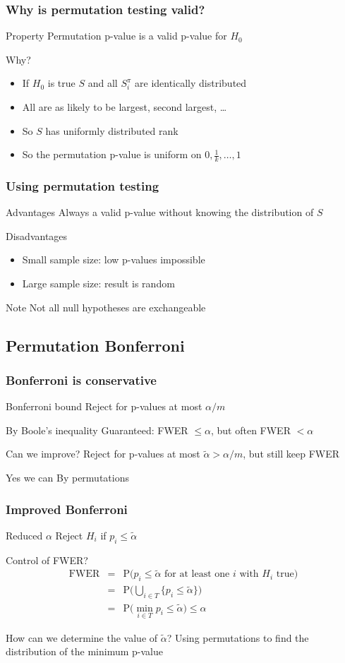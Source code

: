 \documentclass[compress]{beamer}
\newcommand{\bb}[1]{\begin{block}{#1}}
\newcommand{\eb}{\end{block}}
\newcommand{\bi}{\begin {itemize}}
\newcommand{\ei}{\end{itemize}}
\newcommand{\bfr}[1]{\begin{frame} \frametitle{#1}}
\begin{document}
\bfr{Why is permutation testing valid?}
  \bb{Property}
    Permutation p-value is a valid p-value for $H_0$
  \eb
  \bb{Why?}
    \bi
      \item If $H_0$ is true $S$ and all $S^\pi_i$ are identically distributed
      \item All are as likely to be largest, second largest, \ldots
      \item So $S$ has uniformly distributed rank
      \item So the permutation p-value is uniform on $0, \frac1k, \ldots, 1$
    \ei
  \eb
\end{frame}


\bfr{Using permutation testing}
  \bb{Advantages}
    Always a valid p-value without knowing the distribution of $S$
  \eb
  \bb{Disadvantages}
    \bi
      \item Small sample size: low p-values impossible
      \item Large sample size: result is random
    \ei
  \eb
  \bb{Note}
    Not all null hypotheses are exchangeable
  \eb
\end{frame}


\subsection{Permutation Bonferroni}

\bfr{Bonferroni is conservative}
  \bb{Bonferroni bound}
    Reject for p-values at most $\alpha/m$
  \eb
  \bb{By Boole's inequality}
    Guaranteed: FWER $\leq \alpha$, but often FWER $<\alpha$
  \eb
  \bb{Can we improve?}
    Reject for p-values at most $\tilde\alpha > \alpha/m$, but still keep FWER
  \eb
  \bb{Yes we can}
    By permutations
  \eb
\end{frame}


\bfr{Improved Bonferroni}
  \bb{Reduced $\alpha$}
     Reject $H_i$ if $p_i \leq \tilde\alpha$
  \eb
  \bb{Control of FWER?}
    \begin{eqnarray*}
    \mathrm{FWER} &=& \mathrm{P} \big(\textrm{$p_i \leq \tilde\alpha$ for at least one $i$ with $H_i$ true} \big) \\
    &=& \mathrm{P} \Big( \bigcup_{i\in T} \{p_i \leq \tilde\alpha\} \Big) \\
    &=& \mathrm{P} \Big( \min_{i \in T} p_i \leq \tilde\alpha \Big) \leq \alpha
    \end{eqnarray*}
  \eb
  \bb{How can we determine the value of $\tilde \alpha$?}
    Using permutations to find the distribution of the minimum p-value
  \eb
\end{frame}
\end{document}
